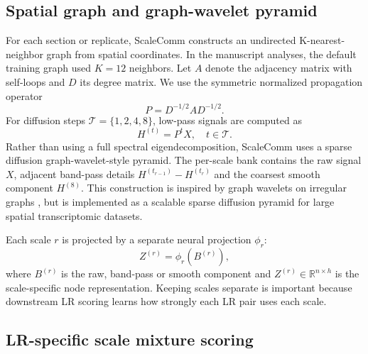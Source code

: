 \documentclass[referee,lineno,pdflatex,sn-vancouver-num]{sn-jnl}
\begin{document}
\subsection{Spatial graph and graph-wavelet pyramid}

For each section or replicate, ScaleComm constructs an undirected K-nearest-neighbor graph from spatial coordinates. In the manuscript analyses, the default training graph used $K=12$ neighbors. Let $A$ denote the adjacency matrix with self-loops and $D$ its degree matrix. We use the symmetric normalized propagation operator
\begin{equation}
P = D^{-1/2} A D^{-1/2}.
\end{equation}
For diffusion steps $\mathcal{T}=\{1,2,4,8\}$, low-pass signals are computed as
\begin{equation}
H^{(t)} = P^t X,\quad t \in \mathcal{T}.
\end{equation}
Rather than using a full spectral eigendecomposition, ScaleComm uses a sparse diffusion graph-wavelet-style pyramid. The per-scale bank contains the raw signal $X$, adjacent band-pass details $H^{(t_{r-1})}-H^{(t_r)}$ and the coarsest smooth component $H^{(8)}$. This construction is inspired by graph wavelets on irregular graphs \citep{hammond2011wavelets}, but is implemented as a scalable sparse diffusion pyramid for large spatial transcriptomic datasets.

Each scale $r$ is projected by a separate neural projection $\phi_r$:
\begin{equation}
Z^{(r)} = \phi_r(B^{(r)}),
\end{equation}
where $B^{(r)}$ is the raw, band-pass or smooth component and $Z^{(r)} \in \mathbb{R}^{n \times h}$ is the scale-specific node representation. Keeping scales separate is important because downstream LR scoring learns how strongly each LR pair uses each scale.

\subsection{LR-specific scale mixture scoring}
\end{document}
